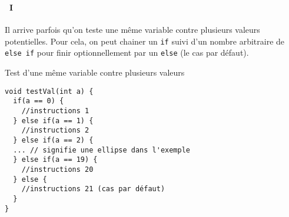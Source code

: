 \begin{frame}[containsverbatim]
  \frametitle{\secname}
  \framesubtitle{\subsecname~I}

  Il arrive parfois qu'on teste une même variable contre plusieurs valeurs potentielles. Pour cela, on peut chainer un \verb|if| suivi d'un nombre arbitraire de 
  \verb|else if| pour finir optionnellement par un \verb|else| (le cas par défaut).
  {\footnotesize\begin{exampleblock}{Test d'une même variable contre plusieurs valeurs}
    \begin{verbatim}
void testVal(int a) {
  if(a == 0) {
    //instructions 1
  } else if(a == 1) {
    //instructions 2  
  } else if(a == 2) {
  ... // signifie une ellipse dans l'exemple
  } else if(a == 19) {
    //instructions 20
  } else {
    //instructions 21 (cas par défaut)
  }
}\end{verbatim}
  \end{exampleblock}}
\end{frame}

